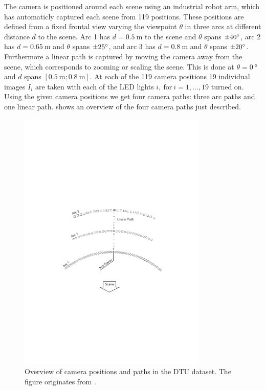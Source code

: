 \documentclass[thesis.tex]{subfiles}
\begin{document}
The camera is positioned around each scene using an industrial robot arm, which has automaticly captured each scene from 119 positions. These positions are defined from a fixed frontal view varying the viewpoint $\theta$ in three arcs at different distance $d$ to the scene. Arc 1 has $d = \SI{0.5}{\meter}$ to the scene and $\theta$ spans $\SI{\pm40}{\degree}$, arc 2 has $d = \SI{0.65}{\meter}$ and $\theta$ spans $\SI{\pm25}{\degree}$, and arc 3 has $d = \SI{0.8}{\meter}$ and $\theta$ spans $\SI{\pm20}{\degree}$. Furthermore a linear path is captured by moving the camera away from the scene, which corresponds to zooming or scaling the scene. This is done at $\theta = \SI{0}{\degree}$ and $d$ spans $[\SI{0.5}{\meter};\SI{0.8}{\meter} ]$. At each of the 119 camera positions 19 individual images $I_i$ are taken with each of the LED lights $i,~\text{for}~i = 1,\hdots,19$ turned on. Using the given camera positions we get four camera paths: three arc paths and one linear path.  shows an overview of the four camera paths just described.

\begin{figure}
	\centering
	\includegraphics[width=0.8\textwidth]{img/CameraPosb.pdf}
	\caption{Overview of camera positions and paths in the DTU dataset. The figure originates from \cite{aanaes2010recall}.}
	\label{fig:dtu_overview}
\end{figure}
\end{document}
